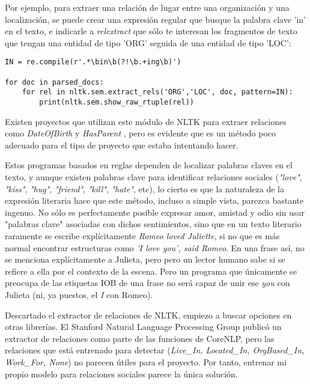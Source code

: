 \documentclass{pre-tfg}
\begin{document}
Por ejemplo, para extraer una relación de lugar entre una organización y una localización, se puede crear una expresión regular que busque la palabra clave 'in' en el texto, e indicarle a \textit{relextract} que sólo te interesan los fragmentos de texto que tengan una entidad de tipo 'ORG' seguida de una entidad de tipo 'LOC':
\begin{lstlisting}[style=consola, caption=Ejemplo de código que utiliza el módulo \textit{regexp} de NLTK para extraer relaciones de lugar y mostrarlas por pantalla. Adaptado del capítulo 7 de Natural Language Processing with Python\cite{bird_2012}]
IN = re.compile(r'.*\bin\b(?!\b.+ing\b)')

for doc in parsed_docs:
	for rel in nltk.sem.extract_rels('ORG','LOC', doc, pattern=IN):
		print(nltk.sem.show_raw_rtuple(rel))

\end{lstlisting}

Existen proyectos que utilizan este módulo de NLTK para extraer relaciones como \textit{DateOfBirth} y \textit{HasParent} \cite{jose_2017}, pero es evidente que es un método poco adecuado para el tipo de proyecto que estaba intentando hacer.

Estos programas basados en reglas dependen de localizar palabras claves en el texto, y aunque existen palabras clave para identificar relaciones sociales (\textit{"love"}, \textit{"kiss"}, \textit{"hug"}, \textit{"friend"}, \textit{"kill"}, \textit{"hate"}, etc), lo cierto es que la naturaleza de la expresión literaria hace que este método, incluso a simple vista, parezca bastante ingenuo. No sólo es perfectamente posible expresar amor, amistad y odio sin usar "palabras clave" asociadas con dichos sentimientos, sino que en un texto literario raramente se escribe explícitamente \textit{Romeo loved Juliette}, si no que es más normal encontrar estructuras como \textit{'I love you', said Romeo}. En una frase así, no se menciona explícitamente a Julieta, pero pero un lector humano sabe si se refiere a ella por el contexto de la escena. Pero un programa que únicamente se preocupa de las etiquetas IOB de una frase no será capaz de unir ese \textit{you} con Julieta (ni, ya puestos, el \textit{I} con Romeo).

Descartado el extractor de relaciones de NLTK, empiezo a buscar opciones en otras librerías. El Stanford Natural Language Processing Group publicó un extractor de relaciones como parte de las funciones de CoreNLP, pero las relaciones que está entrenado para detectar (\textit{Live\_In, Located\_In, OrgBased\_In, Work\_For, None}) no parecen útiles para el proyecto. Por tanto, entrenar mi propio modelo para relaciones sociales parece la única solución.
\end{document}
